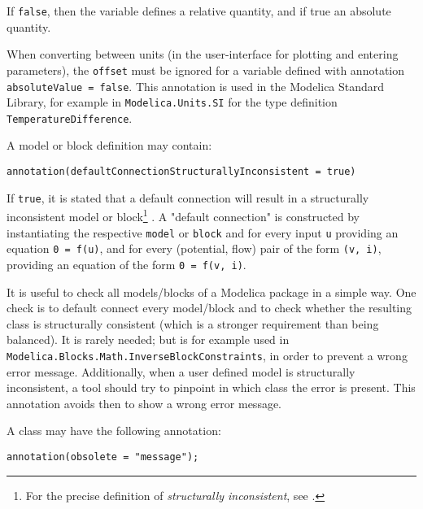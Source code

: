 If \lstinline!false!, then the variable defines a relative quantity, and if true an absolute quantity.

\begin{nonnormative}
When converting between units (in the user-interface for plotting and entering parameters), the \lstinline!offset! must be
ignored for a variable defined with annotation \lstinline!absoluteValue = false!.
This annotation is used in the Modelica Standard Library, for example in
\lstinline!Modelica.Units.SI! for the type definition \lstinline!TemperatureDifference!.
\end{nonnormative}

A model or block definition may contain:
\begin{lstlisting}[language=modelica]
annotation(defaultConnectionStructurallyInconsistent = true)
\end{lstlisting}%

If \lstinline!true!, it is stated that a default connection will result in a structurally inconsistent model or block\footnote{%
  For the precise definition of \emph{structurally inconsistent}, see \textcite{Pantelides1988ConsistentInitialization}.}%
.
A "default connection" is constructed by instantiating the respective \lstinline!model! or \lstinline!block! and for every input \lstinline!u! providing an equation \lstinline!0 = f(u)!, and for every (potential, flow) pair of the form \lstinline!(v, i)!, providing an equation of the form \lstinline!0 = f(v, i)!.

\begin{nonnormative}
It is useful to check all models/blocks of a Modelica package in a simple way.  One check is to default connect every model/block and to check whether the resulting class is structurally consistent (which is a stronger requirement than being balanced).  It is rarely needed; but is for example used in \lstinline!Modelica.Blocks.Math.InverseBlockConstraints!, in order to prevent a wrong error message.  Additionally, when a user defined model is structurally inconsistent, a tool should try to pinpoint in which class the error is present.  This annotation avoids then to show a wrong error message.
\end{nonnormative}

A class may have the following annotation:
\begin{lstlisting}[language=modelica]
annotation(obsolete = "message");
\end{lstlisting}%

